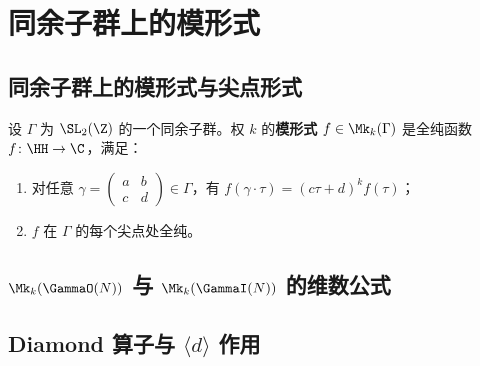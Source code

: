 \chapter{同余子群上的模形式}
\label{ch:modular-forms-congruence}

\section{同余子群上的模形式与尖点形式}

\begin{definition}
设 $\Gamma$ 为 $\SL_2(\Z)$ 的一个同余子群。权 $k$ 的\textbf{模形式}
$f \in \Mk_k(\Gamma)$ 是全纯函数 $f\colon \HH \to \C$，满足：
\begin{enumerate}
  \item 对任意 $\gamma = \begin{pmatrix} a & b \\ c & d \end{pmatrix}
    \in \Gamma$，有 $f(\gamma \cdot \tau) = (c\tau + d)^k f(\tau)$；
  \item $f$ 在 $\Gamma$ 的每个尖点处全纯。
\end{enumerate}
\end{definition}

\section{$\Mk_k(\GammaO(N))$ 与 $\Mk_k(\GammaI(N))$ 的维数公式}


\section{Diamond 算子与 $\langle d \rangle$ 作用}


